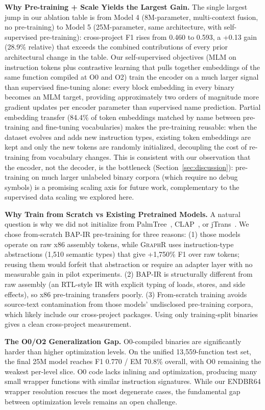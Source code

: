 \documentclass[sigconf,nonacm]{acmart}
\newcommand{\sysname}{\textsc{GraphR}}
\begin{document}
\textbf{Why Pre-training + Scale Yields the Largest Gain.}
\label{sec:pretrain-discussion}
The single largest jump in our ablation table is from Model 4 (8M-parameter, multi-context fusion, no pre-training) to Model 5 (25M-parameter, same architecture, with self-supervised pre-training): cross-project F1 rises from 0.460 to 0.593, a +0.13 gain (28.9\% relative) that exceeds the combined contributions of every prior architectural change in the table. Our self-supervised objectives (MLM on instruction tokens plus contrastive learning that pulls together embeddings of the same function compiled at O0 and O2) train the encoder on a much larger signal than supervised fine-tuning alone: every block embedding in every binary becomes an MLM target, providing approximately two orders of magnitude more gradient updates per encoder parameter than supervised name prediction. Partial embedding transfer (84.4\% of token embeddings matched by name between pre-training and fine-tuning vocabularies) makes the pre-training reusable: when the dataset evolves and adds new instruction types, existing token embeddings are kept and only the new tokens are randomly initialized, decoupling the cost of re-training from vocabulary changes. This is consistent with our observation that the encoder, not the decoder, is the bottleneck (Section~\ref{sec:discussion}): pre-training on much larger unlabeled binary corpora (which require no debug symbols) is a promising scaling axis for future work, complementary to the supervised data scaling we explored here.

\textbf{Why Train from Scratch vs Existing Pretrained Models.}
A natural question is why we did not initialize from PalmTree~\cite{palmtree}, CLAP~\cite{clap}, or jTrans~\cite{jtrans}. We chose from-scratch BAP-IR pre-training for three reasons: (1) those models operate on raw x86 assembly tokens, while \sysname{} uses instruction-type abstractions (1,510 semantic types) that give +1,750\% F1 over raw tokens; reusing them would forfeit that abstraction or require an adapter layer with no measurable gain in pilot experiments. (2) BAP-IR is structurally different from raw assembly (an RTL-style IR with explicit typing of loads, stores, and side effects), so x86 pre-training transfers poorly. (3) From-scratch training avoids source-text contamination from those models' undisclosed pre-training corpora, which likely include our cross-project packages. Using only training-split binaries gives a clean cross-project measurement.

\textbf{The O0/O2 Generalization Gap.}
O0-compiled binaries are significantly harder than higher optimization levels. On the unified 13,559-function test set, the final 25M model reaches F1 0.770 / EM 70.8\% overall, with O0 remaining the weakest per-level slice. O0 code lacks inlining and optimization, producing many small wrapper functions with similar instruction signatures. While our ENDBR64 wrapper resolution rescues the most degenerate cases, the fundamental gap between optimization levels remains an open challenge.
\end{document}
